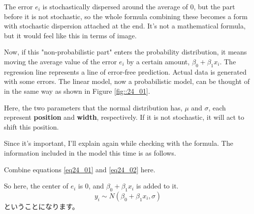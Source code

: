 \documentclass{ltjbook}
\begin{document}
\vspace{0.5cm}
The error $e_i$ is stochastically dispersed around the average of 0, but the part before it is not stochastic, so the whole formula combining these becomes a form with stochastic dispersion attached at the end. It's not a mathematical formula, but it would feel like this in terms of image.


Now, if this "non-probabilistic part" enters the probability distribution, it means moving the average value of the error $e_i$ by a certain amount, $\beta_0 + \beta_1 x_i$.
The regression line represents a line of error-free prediction. Actual data is generated with some errors. The linear model, now a probabilistic model, can be thought of in the same way as shown in Figure \ref{fig::24_01}.


Here, the two parameters that the normal distribution has, $\mu$ and $\sigma$, each represent \textbf{position} and \textbf{width}, respectively. If it is not stochastic, it will act to shift this position.

Since it's important, I'll explain again while checking with the formula. The information included in the model this time is as follows.

Combine equations \ref{eq24_01} and \ref{eq24_02} here.

So here, the center of $e_i$ is $0$, and $\beta_0 + \beta_1 x_i$ is added to it.
\[ y_i \sim N(\beta_0 + \beta_1 x_i, \sigma) \]
ということになります。
\end{document}

